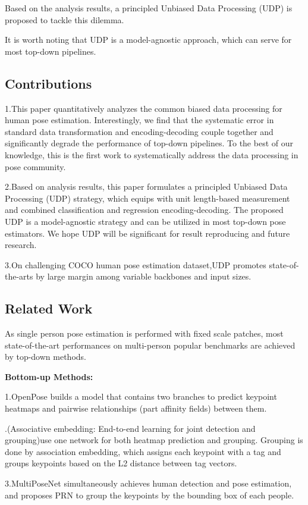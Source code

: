 \documentclass[11pt]{article}
\begin{document}
Based on the analysis results, a principled Unbiased Data Processing (UDP) is proposed to tackle this dilemma.

It is worth noting that UDP is a model-agnostic approach, which can serve for most top-down pipelines.

\subsection{Contributions}
1.This paper quantitatively analyzes the common biased data processing for human pose estimation. Interestingly, we find that the systematic error in standard data transformation and encoding-decoding couple together and significantly degrade the performance of top-down
pipelines. To the best of our knowledge, this is the first work to systematically address the data processing in pose community.

2.Based on analysis results, this paper formulates a principled Unbiased Data Processing (UDP) strategy, which equips with unit length-based measurement and combined classification and regression encoding-decoding. The proposed UDP is a model-agnostic strategy and can be utilized in most top-down pose estimators. We hope UDP will be significant for result
reproducing and future research.

3.On challenging COCO human pose estimation dataset,UDP promotes state-of-the-arts by large margin among variable backbones and input sizes.
\subsection{Related Work}
As single person pose estimation is performed with fixed scale patches, most state-of-the-art performances on multi-person popular benchmarks are achieved by top-down methods.

\textbf{Bottom-up Methods:}

\noindent 1.OpenPose builds a model that contains two branches to predict keypoint heatmaps and pairwise relationships (part affinity fields) between them.

.(Associative embedding: End-to-end learning for joint detection and
grouping)use one network for both heatmap prediction and grouping. Grouping is done by association embedding, which assigns each keypoint with a tag and groups keypoints based on the L2 distance between tag vectors.

\noindent 3.MultiPoseNet simultaneously achieves human detection and pose estimation, and proposes PRN to group the keypoints by the bounding box of each people.
\end{document}

